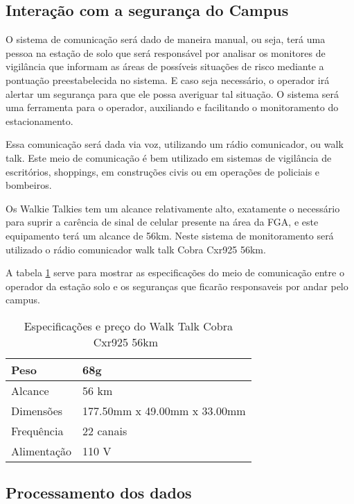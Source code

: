 \subsection{Interação com a segurança do Campus}

O sistema de comunicação será dado de maneira manual, ou seja, terá uma pessoa na estação de solo que será responsável por analisar os monitores de vigilância que  informam as áreas de possíveis situações de risco mediante a pontuação preestabelecida no sistema. E caso seja necessário, o operador irá alertar um segurança para que ele possa averiguar tal situação. O sistema será uma ferramenta para o operador, auxiliando e facilitando o monitoramento do estacionamento.

Essa comunicação será dada via voz, utilizando um rádio comunicador, ou walk talk. Este meio de comunicação é bem utilizado em sistemas de vigilância de escritórios, shoppings, em construções civis ou em operações de policiais e bombeiros.

Os Walkie Talkies tem um alcance relativamente alto, exatamente o necessário para suprir a carência de sinal de celular presente na área da FGA, e este equipamento terá um alcance de  56km. Neste sistema de monitoramento será utilizado o rádio comunicador walk talk Cobra Cxr925 56km.

A tabela \ref{table:walk} serve para mostrar as especificações do meio de comunicação entre o operador da estação solo e os seguranças que ficarão responsaveis por andar pelo campus.
\begin{table}[H]
\centering
\caption[Especificações e preço do Walk Talk Cobra Cxr925 56km]{Especificações e preço do Walk Talk Cobra Cxr925 56km~\cite{walk}}
\begin{tabular}{|l|l|}
\hline
Peso        & 68g                          \\ \hline
Alcance     & 56 km                        \\ \hline
Dimensões   & 177.50mm x 49.00mm x 33.00mm \\ \hline
Frequência  & 22 canais                    \\ \hline
Alimentação & 110 V                        \\ \hline
\end{tabular}
\label{table:walk}
\end{table}

\subsection{Processamento dos dados}

